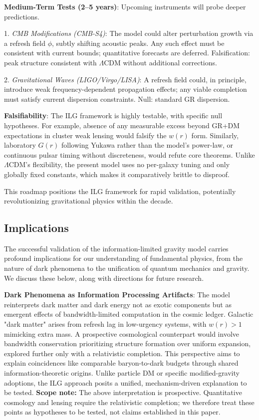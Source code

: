 \documentclass[usenatbib]{mnras}
\begin{document}
\textbf{Medium-Term Tests (2--5 years)}: Upcoming instruments will probe deeper predictions.

1. \emph{CMB Modifications (CMB-S4)}: The model could alter perturbation growth via a refresh field $\phi$, subtly shifting acoustic peaks. Any such effect must be consistent with current bounds; quantitative forecasts are deferred. Falsification: peak structure consistent with $\Lambda$CDM without additional corrections.

2. \emph{Gravitational Waves (LIGO/Virgo/LISA)}: A refresh field could, in principle, introduce weak frequency-dependent propagation effects; any viable completion must satisfy current dispersion constraints. Null: standard GR dispersion.

\textbf{Falsifiability}: The ILG framework is highly testable, with specific null hypotheses. For example, absence of any measurable excess beyond GR+DM expectations in cluster weak lensing would falsify the $w(r)$ form. Similarly, laboratory $G(r)$ following Yukawa rather than the model's power-law, or continuous pulsar timing without discreteness, would refute core theorems. Unlike $\Lambda$CDM's flexibility, the present model uses no per-galaxy tuning and only globally fixed constants, which makes it comparatively brittle to disproof.

This roadmap positions the ILG framework for rapid validation, potentially revolutionizing gravitational physics within the decade.

\subsection{Implications}

The successful validation of the information-limited gravity model carries profound implications for our understanding of fundamental physics, from the nature of dark phenomena to the unification of quantum mechanics and gravity. We discuss these below, along with directions for future research.

\textbf{Dark Phenomena as Information Processing Artifacts}: The model reinterprets dark matter and dark energy not as exotic components but as emergent effects of bandwidth-limited computation in the cosmic ledger. Galactic "dark matter" arises from refresh lag in low-urgency systems, with $w(r) > 1$ mimicking extra mass. A prospective cosmological counterpart would involve bandwidth conservation prioritizing structure formation over uniform expansion, explored further only with a relativistic completion. This perspective aims to explain coincidences like comparable baryon-to-dark budgets through shared information-theoretic origins. Unlike particle DM or specific modified-gravity adoptions, the ILG approach posits a unified, mechanism-driven explanation to be tested.
\textbf{Scope note:} The above interpretation is prospective. Quantitative cosmology and lensing require the relativistic completion; we therefore treat these points as hypotheses to be tested, not claims established in this paper.
\end{document}
